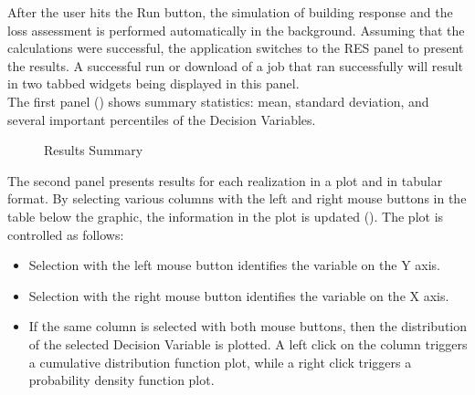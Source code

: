 After the user hits the Run button, the simulation of building response and the loss assessment is performed automatically in the background. Assuming that the calculations were successful, the \texttt{\getsoftwarename{}} application switches to the RES panel to present the results. A successful run or download of a job that ran successfully will result in two tabbed widgets being displayed in this panel.\\

The first panel () shows summary statistics: mean, standard deviation, and several important percentiles of the Decision Variables.\\

\begin{figure}[!htbp]
  \caption{Results Summary}
  \label{fig:results_summary}
\end{figure}

The second panel presents results for each realization in a plot and in tabular format. By selecting various columns with the left and right mouse buttons in the table below the graphic, the information in the plot is updated (). The plot is controlled as follows:

\begin{itemize}
    \item Selection with the left mouse button identifies the variable on the Y axis.
    \item Selection with the right mouse button identifies the variable on the X axis.
    \item If the same column is selected with both mouse buttons, then the distribution of the selected Decision Variable is plotted. A left click on the column triggers a cumulative distribution function plot, while a right click triggers a probability density function plot.
\end{itemize}

